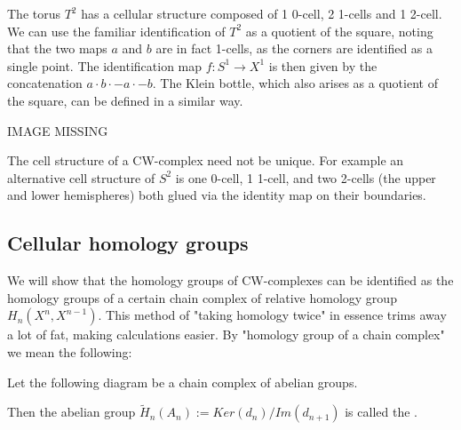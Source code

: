 \begin{example}
The torus $T^2$ has a cellular structure composed of 1 0-cell, 2 1-cells and 1 2-cell. We can use the familiar identification of $T^2$ as a quotient of the square, noting that the two maps $a$ and $b$ are in fact 1-cells, as the corners are identified as a single point. The identification map $f:S^1\rightarrow X^1$ is then given by the concatenation $a\cdot b\cdot -a \cdot -b$. The Klein bottle, which also arises as a quotient of the square, can be defined in a similar way.

IMAGE MISSING
\end{example}

\begin{remark}
The cell structure of a CW-complex need not be unique. For example an alternative cell structure of $S^2$ is one 0-cell, 1 1-cell, and two 2-cells (the upper and lower hemispheres) both glued via the identity map on their boundaries.
\end{remark}

\subsection{Cellular homology groups}

We will show that the homology groups of CW-complexes can be identified as the homology groups of a certain chain complex of relative homology group $H_n(X^n,X^{n-1})$. This method of "taking homology twice" in essence trims away a lot of fat, making calculations easier. By "homology group of a chain complex" we mean the following:

\begin{definition}
Let the following diagram be a chain complex of abelian groups.


Then the abelian group $\tilde{H}_n(A_n):=Ker(d_n)/Im(d_{n+1})$ is called the .
\end{definition}

